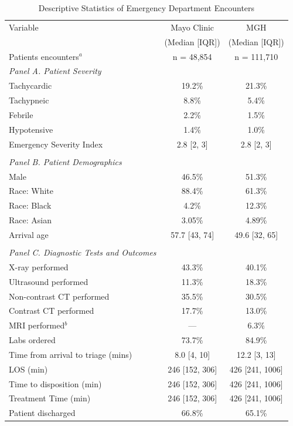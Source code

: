 \documentclass[,,nonblindrev]{informs}
\begin{document}
\begin{table}[h]
\centering
\caption{Descriptive Statistics of Emergency Department Encounters}
\label{tab:desc_stats}
\begin{threeparttable}
\begin{tabular}{p{9cm}cc}
\toprule
Variable & Mayo Clinic & MGH \\
 & (Median [IQR]) & (Median [IQR]) \\
Patients encounters$^a$ & n = 48,854 & n = 111,710 \\
\midrule
\textit{Panel A. Patient Severity} & & \\
Tachycardic & 19.2\% & 21.3\% \\
Tachypneic & 8.8\% & 5.4\% \\
Febrile & 2.2\% & 1.5\% \\
Hypotensive & 1.4\% & 1.0\% \\
Emergency Severity Index & 2.8 [2, 3] & 2.8 [2, 3] \\
\\
\textit{Panel B. Patient Demographics} & & \\
Male & 46.5\% & 51.3\% \\
Race: White & 88.4\% & 61.3\% \\
Race: Black & 4.2\% & 12.3\% \\
Race: Asian & 3.05\% & 4.89\% \\
Arrival age & 57.7 [43, 74] & 49.6 [32, 65] \\
\\
\textit{Panel C. Diagnostic Tests and Outcomes} & & \\
X-ray performed & 43.3\% & 40.1\% \\
Ultrasound performed & 11.3\% & 18.3\% \\
Non-contrast CT performed & 35.5\% & 30.5\% \\
Contrast CT performed & 17.7\% & 13.0\% \\
MRI performed$^{b}$ & --- & 6.3\% \\
Labs ordered & 73.7\% & 84.9\% \\
Time from arrival to triage (mins) & 8.0 [4, 10] & 12.2 [3, 13] \\
LOS (min) & 246 [152, 306] & 426 [241, 1006] \\
Time to disposition (min) & 246 [152, 306] & 426 [241, 1006] \\
Treatment Time (min) & 246 [152, 306] & 426 [241, 1006] \\
Patient discharged & 66.8\% & 65.1\% \\

\end{tabular}
\end{threeparttable}
\end{table}
\end{document}
